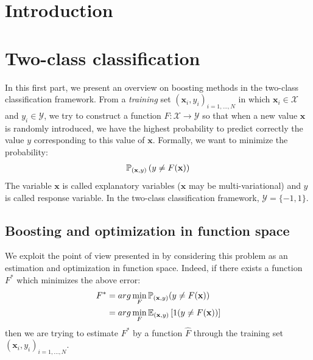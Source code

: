 \documentclass[a4paper,twoside,12pt]{article}
\title{\MYTITLE}
\author{\textsc{Vu} Tuan Hung and \textsc{Do} Quoc Khanh}
\date{\today}
\begin{document}
\maketitle
\pagestyle{fancy}

\section{Introduction}

\section{Two-class classification}
In this first part, we present an overview on boosting methods in the two-class classification framework. From a \textsl{training} set $(\textbf{x}_i, y_i)_{i = 1,...,N}$ in which $\textbf{x}_i \in \mathcal{X}$ and $y_i \in \mathcal{Y}$, we try to construct a function $F: \mathcal{X} \rightarrow \mathcal{Y}$ so that when a new value $\textbf{x}$ is randomly introduced, we have the highest probability to predict correctly the value $y$ corresponding to this value of $\textbf{x}$. Formally, we want to minimize the probability:
\begin{align}
    \mathbb{P}_{(\textbf{x}, y)} \left( y \neq F(\textbf{x})\right) \notag
\end{align}
The variable $\textbf{x}$ is called explanatory variables ($\textbf{x}$ may be multi-variational) and $y$ is called response variable. In the two-class classification framework, $\mathcal{Y} = \{ -1, 1\}$.

\subsection{Boosting and optimization in function space}\label{boo_fun_sp}
We exploit the point of view presented in \cite{trebst} by considering this problem as an estimation and optimization in function space. Indeed, if there exists a function $F^{*}$ which minimizes the above error:
\begin{align}
    F^{*} &= arg\min\limits_{F} \mathbb{P}_{(\textbf{x},y)} (y \neq F(\textbf{x})) \notag \\
    &= arg\min\limits_{F} \mathbb{E}_{(\textbf{x}, y)} \left[ 1(y \neq F(\textbf{x}))\right] \notag
\end{align}
then we are trying to estimate $F^{*}$ by a function $\hat{F}$ through the training set $(\textbf{x}_i, y_i)_{i=1,...,N}$.
\end{document}
